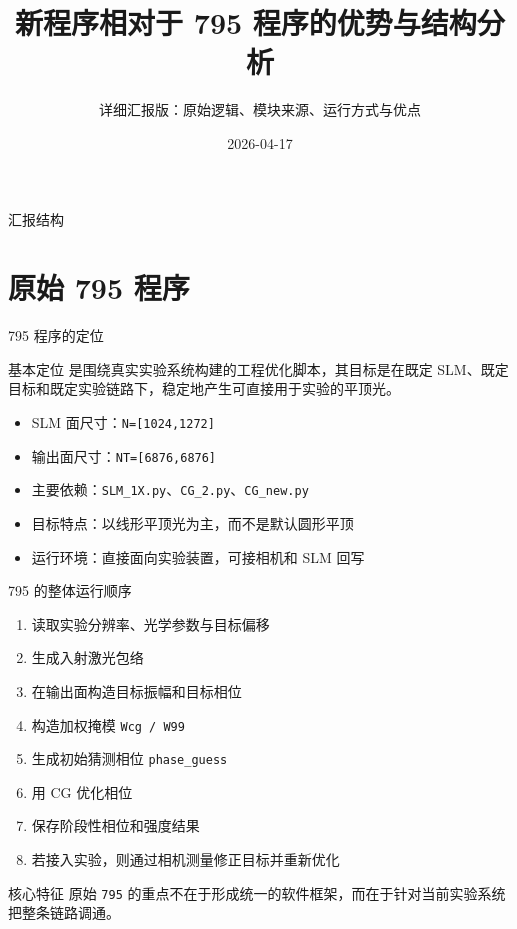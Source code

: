 \documentclass[aspectratio=169,10pt]{ctexbeamer}
\title{新程序相对于 795 程序的优势与结构分析}
\subtitle{详细汇报版：原始逻辑、模块来源、运行方式与优点}
\author{}
\date{2026-04-17}
\begin{document}
\begin{frame}
  \titlepage
\end{frame}

\begin{frame}{汇报结构}
  \tableofcontents
\end{frame}

\section{原始 795 程序}

\begin{frame}{795 程序的定位}
  \begin{block}{基本定位}
     是围绕真实实验系统构建的工程优化脚本，其目标是在既定 SLM、既定目标和既定实验链路下，稳定地产生可直接用于实验的平顶光。
  \end{block}

  \begin{itemize}
    \item SLM 面尺寸：\texttt{N=[1024,1272]}
    \item 输出面尺寸：\texttt{NT=[6876,6876]}
    \item 主要依赖：\texttt{SLM\_1X.py}、\texttt{CG\_2.py}、\texttt{CG\_new.py}
    \item 目标特点：以线形平顶光为主，而不是默认圆形平顶
    \item 运行环境：直接面向实验装置，可接相机和 SLM 回写
  \end{itemize}
\end{frame}

\begin{frame}{795 的整体运行顺序}
  \begin{enumerate}
    \item 读取实验分辨率、光学参数与目标偏移
    \item 生成入射激光包络
    \item 在输出面构造目标振幅和目标相位
    \item 构造加权掩模 \texttt{Wcg / W99}
    \item 生成初始猜测相位 \texttt{phase\_guess}
    \item 用 CG 优化相位
    \item 保存阶段性相位和强度结果
    \item 若接入实验，则通过相机测量修正目标并重新优化
  \end{enumerate}

  \vspace{0.4em}
  \begin{block}{核心特征}
    原始 \texttt{795} 的重点不在于形成统一的软件框架，而在于针对当前实验系统把整条链路调通。
  \end{block}
\end{frame}
\end{document}
